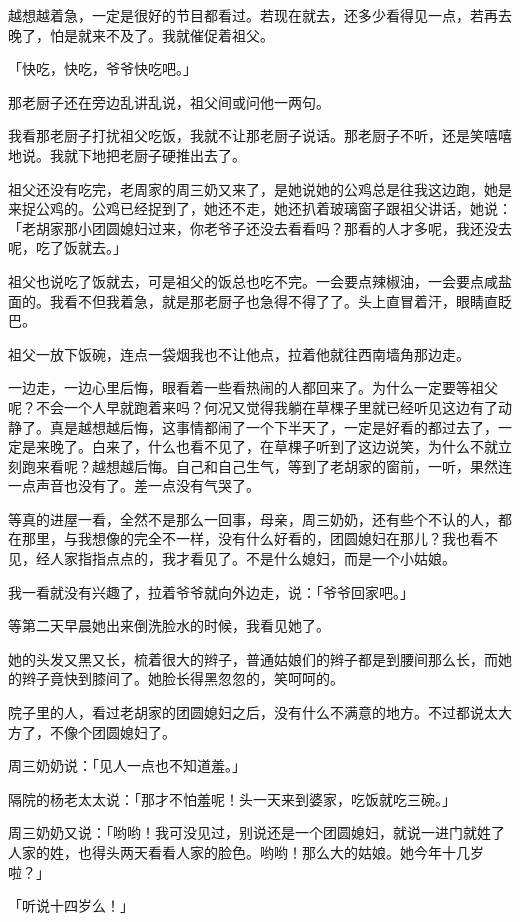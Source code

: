 \documentclass[UTF8]{ctexart}
\begin{document}
越想越着急，一定是很好的节目都看过。若现在就去，还多少看得见一点，若再去晚了，怕是就来不及了。我就催促着祖父。

「快吃，快吃，爷爷快吃吧。」

那老厨子还在旁边乱讲乱说，祖父间或问他一两句。

我看那老厨子打扰祖父吃饭，我就不让那老厨子说话。那老厨子不听，还是笑嘻嘻地说。我就下地把老厨子硬推出去了。

祖父还没有吃完，老周家的周三奶又来了，是她说她的公鸡总是往我这边跑，她是来捉公鸡的。公鸡已经捉到了，她还不走，她还扒着玻璃窗子跟祖父讲话，她说：「老胡家那小团圆媳妇过来，你老爷子还没去看看吗？那看的人才多呢，我还没去呢，吃了饭就去。」

祖父也说吃了饭就去，可是祖父的饭总也吃不完。一会要点辣椒油，一会要点咸盐面的。我看不但我着急，就是那老厨子也急得不得了了。头上直冒着汗，眼睛直眨巴。

祖父一放下饭碗，连点一袋烟我也不让他点，拉着他就往西南墙角那边走。

一边走，一边心里后悔，眼看着一些看热闹的人都回来了。为什么一定要等祖父呢？不会一个人早就跑着来吗？何况又觉得我躺在草棵子里就已经听见这边有了动静了。真是越想越后悔，这事情都闹了一个下半天了，一定是好看的都过去了，一定是来晚了。白来了，什么也看不见了，在草棵子听到了这边说笑，为什么不就立刻跑来看呢？越想越后悔。自己和自己生气，等到了老胡家的窗前，一听，果然连一点声音也没有了。差一点没有气哭了。

等真的进屋一看，全然不是那么一回事，母亲，周三奶奶，还有些个不认的人，都在那里，与我想像的完全不一样，没有什么好看的，团圆媳妇在那儿？我也看不见，经人家指指点点的，我才看见了。不是什么媳妇，而是一个小姑娘。

我一看就没有兴趣了，拉着爷爷就向外边走，说：「爷爷回家吧。」

等第二天早晨她出来倒洗脸水的时候，我看见她了。

她的头发又黑又长，梳着很大的辫子，普通姑娘们的辫子都是到腰间那么长，而她的辫子竟快到膝间了。她脸长得黑忽忽的，笑呵呵的。

院子里的人，看过老胡家的团圆媳妇之后，没有什么不满意的地方。不过都说太大方了，不像个团圆媳妇了。

周三奶奶说：「见人一点也不知道羞。」

隔院的杨老太太说：「那才不怕羞呢！头一天来到婆家，吃饭就吃三碗。」

周三奶奶又说：「哟哟！我可没见过，别说还是一个团圆媳妇，就说一进门就姓了人家的姓，也得头两天看看人家的脸色。哟哟！那么大的姑娘。她今年十几岁啦？」

「听说十四岁么！」
\end{document}
